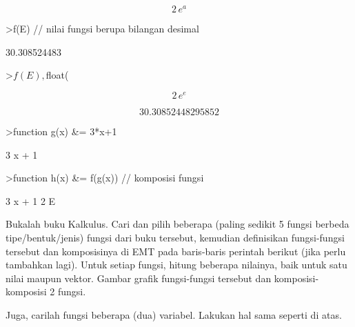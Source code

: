 \documentclass[a4paper,10pt]{article}
\begin{document}
\begin{eulernotebook}
\begin{eulercomment}
\begin{eulercomment}
\begin{eulercomment}
\begin{eulercomment}
\begin{euleroutput}
\end{euleroutput}
\begin{eulerformula}
\[
2\,e^{a}
\]
\end{eulerformula}
\begin{eulerprompt}
>f(E) // nilai fungsi berupa bilangan desimal
\end{eulerprompt}
\begin{euleroutput}
  30.308524483
\end{euleroutput}
\begin{eulerprompt}
>$f(E), $float(%
\end{eulerprompt}
\begin{eulerformula}
\[
2\,e^{e}
\]
\end{eulerformula}
\begin{eulerformula}
\[
30.30852448295852
\]
\end{eulerformula}
\begin{eulerprompt}
>function g(x) &= 3*x+1
\end{eulerprompt}
\begin{euleroutput}
  
                                 3 x + 1
  
\end{euleroutput}
\begin{eulerprompt}
>function h(x) &= f(g(x)) // komposisi fungsi
\end{eulerprompt}
\begin{euleroutput}
  
                                   3 x + 1
                                2 E
  
\end{euleroutput}
\begin{eulercomment}
\end{eulercomment}
\begin{eulercomment}
Bukalah buku Kalkulus. Cari dan pilih beberapa (paling sedikit 5
fungsi berbeda tipe/bentuk/jenis) fungsi dari buku tersebut, kemudian
definisikan fungsi-fungsi tersebut dan komposisinya di EMT pada
baris-baris perintah berikut (jika perlu tambahkan lagi). Untuk setiap
fungsi, hitung beberapa nilainya, baik untuk satu nilai maupun vektor.
Gambar grafik fungsi-fungsi tersebut dan komposisi-komposisi 2 fungsi.

Juga, carilah fungsi beberapa (dua) variabel. Lakukan hal sama seperti
di atas.


\end{eulercomment}
\end{eulercomment}
\end{eulercomment}
\end{eulercomment}
\end{eulercomment}
\end{eulernotebook}
\end{document}
